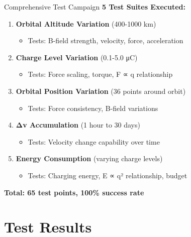 \documentclass[aspectratio=169]{beamer}
\begin{document}
\begin{frame}{Comprehensive Test Campaign}
\textbf{5 Test Suites Executed:}

\begin{enumerate}
    \item \textbf{Orbital Altitude Variation} (400-1000 km)
    \begin{itemize}
        \item Tests: B-field strength, velocity, force, acceleration
    \end{itemize}

    \item \textbf{Charge Level Variation} (0.1-5.0 μC)
    \begin{itemize}
        \item Tests: Force scaling, torque, F ∝ q relationship
    \end{itemize}

    \item \textbf{Orbital Position Variation} (36 points around orbit)
    \begin{itemize}
        \item Tests: Force consistency, B-field variations
    \end{itemize}

    \item \textbf{Δv Accumulation} (1 hour to 30 days)
    \begin{itemize}
        \item Tests: Velocity change capability over time
    \end{itemize}

    \item \textbf{Energy Consumption} (varying charge levels)
    \begin{itemize}
        \item Tests: Charging energy, E ∝ q² relationship, budget
    \end{itemize}
\end{enumerate}

\vspace{1em}
\begin{center}
\textbf{Total: 65 test points, 100\% success rate}
\end{center}
\end{frame}

\section{Test Results}
\end{document}
